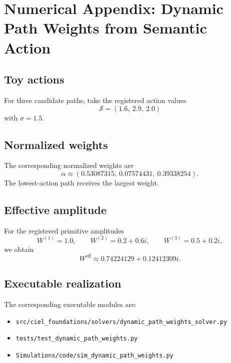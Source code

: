 \appendix
\section{Numerical Appendix: Dynamic Path Weights from Semantic Action}
\label{app:dynamic-path-weights}

\subsection{Toy actions}
For three candidate paths, take the registered action values
\begin{equation}
\mathcal S = (1.6,\ 2.9,\ 2.0)
\end{equation}
with $\sigma = 1.5$.

\subsection{Normalized weights}
The corresponding normalized weights are
\begin{equation}
\alpha \approx (0.53087315,\ 0.07574431,\ 0.39338254).
\end{equation}
The lowest-action path receives the largest weight.

\subsection{Effective amplitude}
For the registered primitive amplitudes
\begin{equation}
W^{(1)} = 1.0,
\qquad
W^{(2)} = 0.2+0.6i,
\qquad
W^{(3)} = 0.5+0.2i,
\end{equation}
we obtain
\begin{equation}
W^{\mathrm{eff}} \approx 0.74224129 + 0.12412309 i.
\end{equation}

\subsection{Executable realization}
The corresponding executable modules are:
\begin{itemize}
  \item \texttt{src/ciel\_foundations/solvers/dynamic\_path\_weights\_solver.py}
  \item \texttt{tests/test\_dynamic\_path\_weights.py}
  \item \texttt{Simulations/code/sim\_dynamic\_path\_weights.py}
\end{itemize}

